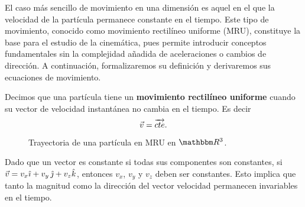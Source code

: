 El caso más sencillo de movimiento en una dimensión es aquel en el que la velocidad de la partícula permanece constante en el tiempo. Este tipo de movimiento, conocido como movimiento rectilíneo uniforme (MRU), constituye la base para el estudio de la cinemática, pues permite introducir conceptos fundamentales sin la complejidad añadida de aceleraciones o cambios de dirección. A continuación, formalizaremos su definición y derivaremos sus ecuaciones de movimiento.

\begin{definition}{}{}
    Decimos que una partícula tiene un \textbf{movimiento rectilíneo uniforme} cuando su vector de velocidad instantánea no cambia en el tiempo. Es decir
    $$\vec{v} = \overrightarrow{cte}.$$
\end{definition}
\begin{figure}
    \centering
    \caption{Trayectoria de una partícula en MRU en $\RR[3]$.}
    \label{fig:MRU_3D}
\end{figure}

Dado que un vector es constante si todas sus componentes son constantes, si $\vec{v} = v_x\hat{\imath}+ v_y\,\hat{\jmath}+ v_z\hat{k}$, entonces $v_x$, $v_y$ y $v_z$ deben ser constantes. Esto implica que tanto la magnitud como la dirección del vector velocidad permanecen invariables en el tiempo.

